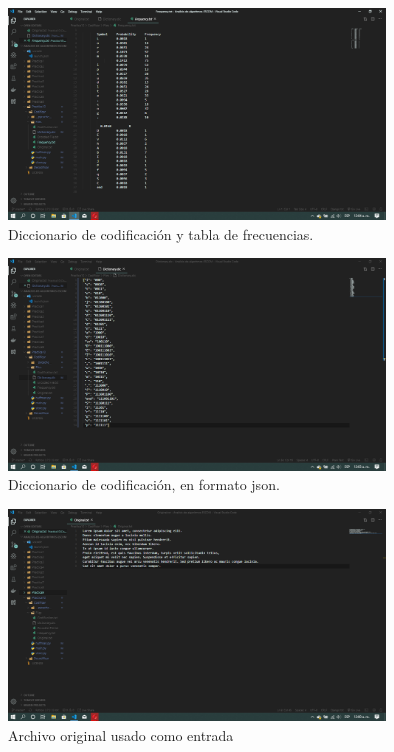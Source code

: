 \documentclass[12pt,twoside]{article}
\begin{document}
\begin{figure}[ht]
    \centering
    \includegraphics[width=10cm,keepaspectratio]{freq_huff.png}
    \caption{Diccionario de codificaci\'on y tabla de frecuencias.}
    \label{fig:huff_uno}
\end{figure}
\begin{figure}[ht]
    \centering
    \includegraphics[width=10cm,keepaspectratio]{dicc_json_huff.png}
    \caption{Diccionario de codificaci\'on, en formato json.}
    \label{fig:huff_dos}
\end{figure}
\begin{figure}[ht]
    \centering
    \includegraphics[width=10cm,keepaspectratio]{orig_huff.png}
    \caption{Archivo original usado como entrada}
    \label{fig:huff_tres}
\end{figure}
\end{document}
